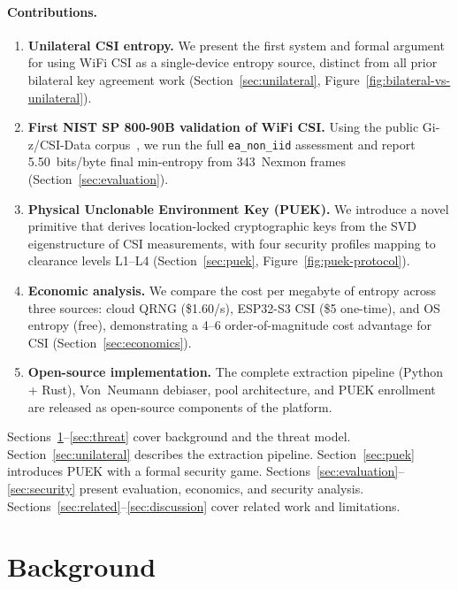 \paragraph{Contributions.}
\begin{enumerate}
\item \textbf{Unilateral CSI entropy.}
We present the first system and formal argument for using WiFi CSI as a single-device entropy source, distinct from all prior bilateral key agreement work (Section~\ref{sec:unilateral}, Figure~\ref{fig:bilateral-vs-unilateral}).

\item \textbf{First NIST SP 800-90B validation of WiFi CSI.}
Using the public Gi-z/CSI-Data corpus~\cite{gringoli2019csidata}, we run the full \texttt{ea\_non\_iid} assessment and report 5.50~bits/byte final min-entropy from 343~Nexmon frames (Section~\ref{sec:evaluation}).

\item \textbf{Physical Unclonable Environment Key (PUEK).}
We introduce a novel primitive that derives location-locked cryptographic keys from the SVD eigenstructure of CSI measurements, with four security profiles mapping to clearance levels L1--L4 (Section~\ref{sec:puek}, Figure~\ref{fig:puek-protocol}).

\item \textbf{Economic analysis.}
We compare the cost per megabyte of entropy across three sources: cloud QRNG (\$1.60/s), ESP32-S3 CSI (\$5 one-time), and OS entropy (free), demonstrating a 4--6 order-of-magnitude cost advantage for CSI (Section~\ref{sec:economics}).

\item \textbf{Open-source implementation.}
The complete extraction pipeline (Python + Rust), Von~Neumann debiaser, pool architecture, and PUEK enrollment are released as open-source components of the \zipminator platform.
\end{enumerate}

\noindent
Sections~\ref{sec:background}--\ref{sec:threat} cover background and the threat model.
Section~\ref{sec:unilateral} describes the extraction pipeline.
Section~\ref{sec:puek} introduces PUEK with a formal security game.
Sections~\ref{sec:evaluation}--\ref{sec:security} present evaluation, economics, and security analysis.
Sections~\ref{sec:related}--\ref{sec:discussion} cover related work and limitations.

\section{Background}
\label{sec:background}

